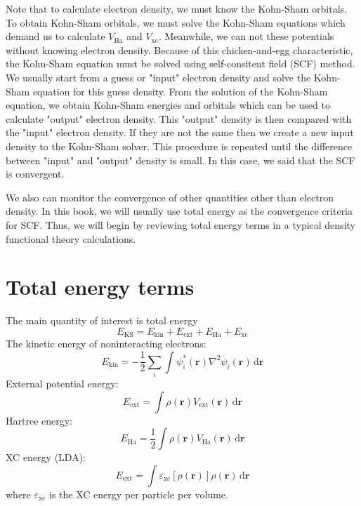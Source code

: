 Note that to calculate electron density, we must know the Kohn-Sham orbitals.
To obtain Kohn-Sham orbitals, we must solve the Kohn-Sham equations which
demand us to calculate $V_{\mathrm{Ha}}$ and $V_{\mathrm{xc}}$. Meanwhile,
we can not these potentials without knowing electron density.
Because of this chicken-and-egg
characteristic, the Kohn-Sham equation must be solved using self-consitent field (SCF) method.
We usually start from a guess or "input" electron density and solve the Kohn-Sham equation
for this guess density. From the solution of the Kohn-Sham equation, we obtain
Kohn-Sham energies and orbitals which can be used to calculate "output" electron density.
This "output" density is then compared with the "input" electron density. If they are
not the same then we create a new input density to the Kohn-Sham solver. This procedure
is repeated until the difference between "input" and "output" density is small.
In this case, we said that the SCF is convergent.

We also can monitor the convergence of other quantities other than electron density.
In this book, we will usually use total energy as the convergence criteria for SCF.
Thus, we will begin by reviewing total energy terms in a typical density functional
theory calculations.

\section{Total energy terms}

The main quantity of interest is total energy
\begin{equation}
E_{\mathrm{KS}} = E_{\mathrm{kin}} + E_{\mathrm{ext}}
+ E_{\mathrm{Ha}} + E_{\mathrm{xc}}
\end{equation}
%
The kinetic energy of noninteracting electrons:
\begin{equation}
E_{\mathrm{kin}} = -\frac{1}{2}\sum_{i} \int \psi_{i}^{*}(\mathbf{r}) \nabla^2 \psi_{i}(\mathbf{r})
\,\mathrm{d}\mathbf{r}
\end{equation}
%
External potential energy:
\begin{equation}
E_{\mathrm{ext}} = \int \rho(\mathbf{r}) V_{\mathrm{ext}}(\mathbf{r})
\,\mathrm{d}\mathbf{r}
\end{equation}
%
Hartree energy:
\begin{equation}
E_{\mathrm{Ha}} = \frac{1}{2} \int \rho(\mathbf{r}) V_{\mathrm{Ha}}(\mathbf{r})
\,\mathrm{d}\mathbf{r}
\end{equation}
%
XC energy (LDA):
\begin{equation}
E_{\mathrm{ext}} = \int \varepsilon_{\mathrm{xc}}[\rho(\mathbf{r})] \rho(\mathbf{r})
\,\mathrm{d}\mathbf{r}
\end{equation}
where $\varepsilon_{\mathrm{xc}}$ is the XC energy per particle per volume.


